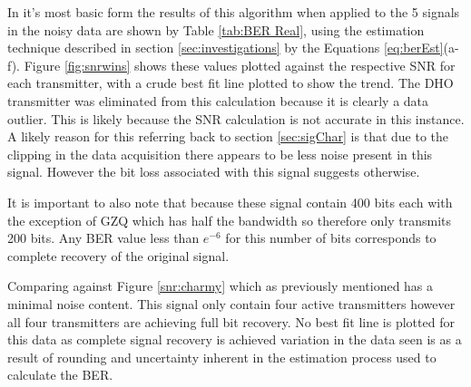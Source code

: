 In it's most basic form the results of this algorithm when applied to the 5 signals in the noisy data are shown by Table \ref{tab:BER Real}, using the estimation technique described in section \ref{sec:investigations} by the Equations \ref{eq:berEst}(a-f). Figure \ref{fig:snrwins} shows these values plotted against the respective SNR for each transmitter, with a crude best fit line plotted to show the trend. The DHO transmitter was eliminated from this calculation because it is clearly a data outlier. This is likely because the SNR calculation is not accurate in this instance. A likely reason for this referring back to section \ref{sec:sigChar} is that due to the clipping in the data acquisition there appears to be less noise present in this signal. However the bit loss associated with this signal suggests otherwise. 

It is important to also note that because these signal contain 400 bits each with the exception of GZQ which has half the bandwidth so therefore only transmits 200 bits. Any BER value less than $e^{-6}$ for this number of bits corresponds to complete recovery of the original signal.

Comparing against Figure \ref{snr:charmy} which as previously mentioned has a minimal noise content. This signal only contain four active transmitters however all four transmitters are achieving full bit recovery. No best fit line is plotted for this data as complete signal recovery is achieved variation in the data seen is as a result of rounding and uncertainty inherent in the estimation process used to calculate the BER.

